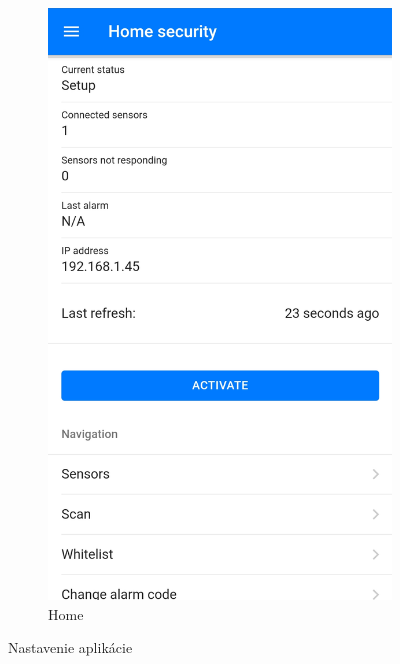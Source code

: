\begin{figure}[!ht]
\begin{subfigure}{.4\textwidth}
      \includegraphics[width=.8\linewidth]{obrazky-figures/screen_home.jpg}  
      \caption{Home}
      \label{fig:screen_home}
    \end{subfigure}
    \caption{Nastavenie aplikácie}
    \label{fig:nastavenie_aplikacie}
\end{figure}

